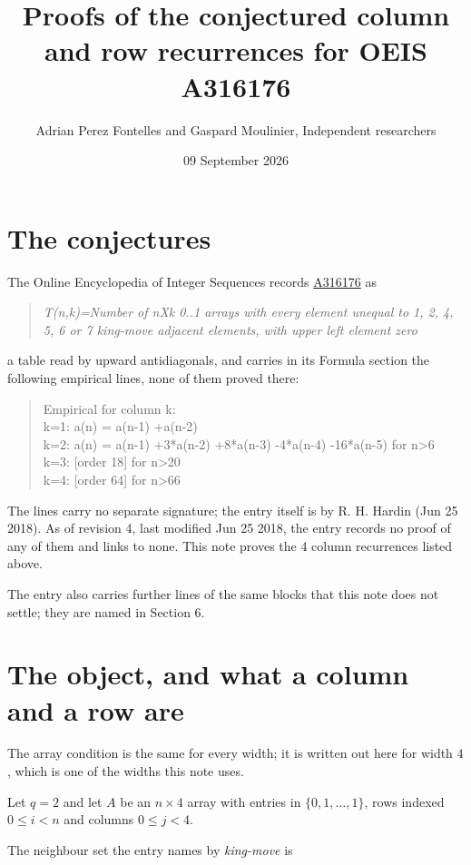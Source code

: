 \documentclass[11pt]{article}
\title{Proofs of the conjectured column and row recurrences for OEIS A316176}
\author{Adrian Perez Fontelles and Gaspard Moulinier, Independent researchers}
\date{09 September 2026}
\theoremstyle{definition}
\begin{document}
\maketitle
\section{The conjectures}

The Online Encyclopedia of Integer Sequences records \href{https://oeis.org/A316176}{A316176} as

\begin{quote}\itshape T(n,k)=Number of nXk 0..1 arrays with every element unequal to 1, 2, 4, 5, 6 or 7 king-move adjacent elements, with upper left element zero\end{quote}

a table read by upward antidiagonals, and carries in its Formula section the following empirical lines, none of them proved there:

\begin{quote}\ttfamily Empirical for column k:\\
k=1: a(n) = a(n-1) +a(n-2)\\k=2: a(n) = a(n-1) +3*a(n-2) +8*a(n-3) -4*a(n-4) -16*a(n-5) for n>6\\k=3: [order 18] for n>20\\k=4: [order 64] for n>66\end{quote}

The lines carry no separate signature; the entry itself is by R. H. Hardin (Jun 25 2018). As of revision 4, last modified Jun 25 2018, the entry records no proof of any of them and links to none. This note proves the 4 column recurrences listed above.

The entry also carries further lines of the same blocks that this note does not settle; they are named in Section 6.

\section{The object, and what a column and a row are}

The array condition is the same for every width; it is written out here for width $4$, which is one of the widths this note uses.

Let $q = 2$ and let $A$ be an $n \times 4$ array with entries in $\{0,1,\dots,1\}$, rows indexed $0 \le i < n$ and columns $0 \le j < 4$.

The neighbour set the entry names by {\itshape king-move} is
\end{document}
